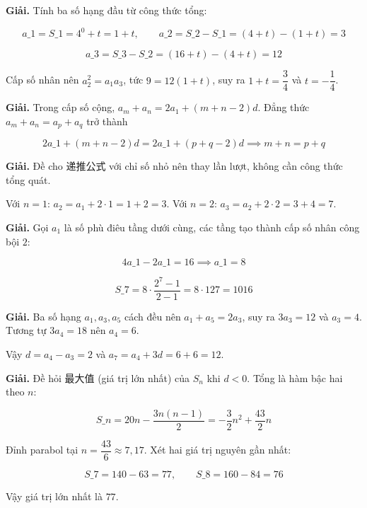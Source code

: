\documentclass[11pt, a4paper]{article}
\begin{document}
\begin{dapan}[5 — Đáp án D]
\textbf{Giải.} Tính ba số hạng đầu từ công thức tổng:

$$a\_1 = S\_1 = 4^0 + t = 1 + t, \qquad a\_2 = S\_2 - S\_1 = (4 + t) - (1 + t) = 3$$

$$a\_3 = S\_3 - S\_2 = (16 + t) - (4 + t) = 12$$

Cấp số nhân nên $a_2^2 = a_1 a_3$, tức $9 = 12(1 + t)$, suy ra $1 + t = \dfrac{3}{4}$ và $t = -\dfrac{1}{4}$.
\end{dapan}

\begin{dapan}[6 — Đáp án D]
\textbf{Giải.} Trong cấp số cộng, $a_m + a_n = 2a_1 + (m + n - 2)d$. Đẳng thức $a_m + a_n = a_p + a_q$ trở thành

$$2a\_1 + (m+n-2)d = 2a\_1 + (p+q-2)d \implies m + n = p + q$$
\end{dapan}

\begin{dapan}[7 — Đáp án D]
\textbf{Giải.} Đề cho 递推公式 với chỉ số nhỏ nên thay lần lượt, không cần công thức tổng quát.

Với $n = 1$: $a_2 = a_1 + 2 \cdot 1 = 1 + 2 = 3$. Với $n = 2$: $a_3 = a_2 + 2 \cdot 2 = 3 + 4 = 7$.
\end{dapan}

\begin{dapan}[8 — Đáp án A]
\textbf{Giải.} Gọi $a_1$ là số phù điêu tầng dưới cùng, các tầng tạo thành cấp số nhân công bội $2$:

$$4a\_1 - 2a\_1 = 16 \implies a\_1 = 8$$

$$S\_7 = 8 \cdot \frac{2^7 - 1}{2 - 1} = 8 \cdot 127 = 1016$$
\end{dapan}

\begin{dapan}[9 — Đáp án A]
\textbf{Giải.} Ba số hạng $a_1, a_3, a_5$ cách đều nên $a_1 + a_5 = 2a_3$, suy ra $3a_3 = 12$ và $a_3 = 4$. Tương tự $3a_4 = 18$ nên $a_4 = 6$.

Vậy $d = a_4 - a_3 = 2$ và $a_7 = a_4 + 3d = 6 + 6 = 12$.
\end{dapan}

\begin{dapan}[10 — Đáp án A]
\textbf{Giải.} Đề hỏi 最大值 (giá trị lớn nhất) của $S_n$ khi $d < 0$. Tổng là hàm bậc hai theo $n$:

$$S\_n = 20n - \frac{3n(n-1)}{2} = -\frac{3}{2}n^2 + \frac{43}{2}n$$

Đỉnh parabol tại $n = \dfrac{43}{6} \approx 7{,}17$. Xét hai giá trị nguyên gần nhất:

$$S\_7 = 140 - 63 = 77, \qquad S\_8 = 160 - 84 = 76$$

Vậy giá trị lớn nhất là $77$.
\end{dapan}
\end{document}
